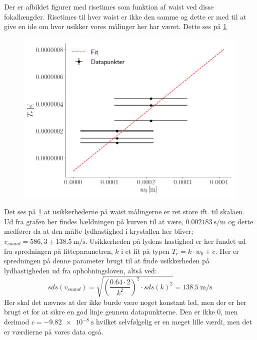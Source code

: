 \documentclass[main]{subfiles}
\begin{document}
Der er afbildet figurer med risetimes som funktion af waist ved disse fokallængder. Risetimes til hver waist er ikke den samme og dette er med til at give en ide om hvor usikker vores målinger her har været. Dette ses på \cref{fig:risetime_fig}
\begin{figure}[H]
  \includegraphics[width=\linewidth]{tegninger/risetime_fig.png}
  \caption{}
  \label{fig:risetime_fig}
\end{figure}
Det ses på \cref{fig:risetime_fig} at usikkerhederne på waist målingerne er ret store ift. til skalaen. Ud fra grafen her findes hældningen på kurven til at være, $\SI{0,002183}{\second\per\meter}$ og dette medfører da at den målte lydhastighed i krystallen her bliver: $v_{sound} = 586,3 \pm 138.5 \ \si{\meter\per\second}$. Usikkerheden på lydens hastighed er her fundet ud fra spredningen på fitteparametren, $k$ i et fit på typen $T_r = k\cdot w_0 +c $. Her er spredningen på denne parameter brugt til at finde usikkerheden på lydhastigheden ud fra ophobningsloven, altså ved:
\begin{equation}
  \nonumber sds(v_{sound}) = \sqrt{\left(\frac{0.64 \cdot 2}{k^2}\right)^2 \cdot sds(k)^2} = \SI{138.5}{\meter\per\second}
\end{equation}
Her skal det nævnes at der ikke burde være noget konstant led, men der er her brugt et for at sikre en god linje gennem datapunkterne. Den er ikke 0, men derimod $c = \SI{-9,82e-8}{\second}$ hvilket selvfølgelig er en meget lille værdi, men det er værdierne på vores data også.
\end{document}
